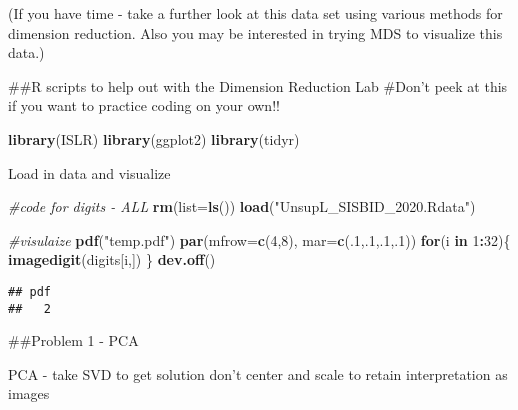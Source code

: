 \documentclass[
]{article}
\newenvironment{Shaded}{\begin{snugshade}}{\end{snugshade}}
\newcommand{\CommentTok}[1]{\textcolor[rgb]{0.56,0.35,0.01}{\textit{#1}}}
\newcommand{\ControlFlowTok}[1]{\textcolor[rgb]{0.13,0.29,0.53}{\textbf{#1}}}
\newcommand{\DataTypeTok}[1]{\textcolor[rgb]{0.13,0.29,0.53}{#1}}
\newcommand{\DecValTok}[1]{\textcolor[rgb]{0.00,0.00,0.81}{#1}}
\newcommand{\KeywordTok}[1]{\textcolor[rgb]{0.13,0.29,0.53}{\textbf{#1}}}
\newcommand{\NormalTok}[1]{#1}
\newcommand{\OperatorTok}[1]{\textcolor[rgb]{0.81,0.36,0.00}{\textbf{#1}}}
\newcommand{\StringTok}[1]{\textcolor[rgb]{0.31,0.60,0.02}{#1}}
\begin{document}
(If you have time - take a further look at this data set using various
methods for dimension reduction. Also you may be interested in trying
MDS to visualize this data.)

\#\#R scripts to help out with the Dimension Reduction Lab \#Don't peek
at this if you want to practice coding on your own!!

\begin{Shaded}
\begin{Highlighting}[]
\KeywordTok{library}\NormalTok{(ISLR)}
\KeywordTok{library}\NormalTok{(ggplot2)}
\KeywordTok{library}\NormalTok{(tidyr)}
\end{Highlighting}
\end{Shaded}

Load in data and visualize

\begin{Shaded}
\begin{Highlighting}[]
\CommentTok{#code for digits - ALL}
\KeywordTok{rm}\NormalTok{(}\DataTypeTok{list=}\KeywordTok{ls}\NormalTok{())}
\KeywordTok{load}\NormalTok{(}\StringTok{"UnsupL_SISBID_2020.Rdata"}\NormalTok{)}

\CommentTok{#visulaize}
\KeywordTok{pdf}\NormalTok{(}\StringTok{"temp.pdf"}\NormalTok{)}
\KeywordTok{par}\NormalTok{(}\DataTypeTok{mfrow=}\KeywordTok{c}\NormalTok{(}\DecValTok{4}\NormalTok{,}\DecValTok{8}\NormalTok{), }\DataTypeTok{mar=}\KeywordTok{c}\NormalTok{(.}\DecValTok{1}\NormalTok{,.}\DecValTok{1}\NormalTok{,.}\DecValTok{1}\NormalTok{,.}\DecValTok{1}\NormalTok{))}
\ControlFlowTok{for}\NormalTok{(i }\ControlFlowTok{in} \DecValTok{1}\OperatorTok{:}\DecValTok{32}\NormalTok{)\{}
  \KeywordTok{imagedigit}\NormalTok{(digits[i,])}
\NormalTok{\}}
\KeywordTok{dev.off}\NormalTok{()}
\end{Highlighting}
\end{Shaded}

\begin{verbatim}
## pdf 
##   2
\end{verbatim}

\#\#Problem 1 - PCA

PCA - take SVD to get solution don't center and scale to retain
interpretation as images

\begin{Shaded}
\end{Shaded}
\end{document}
